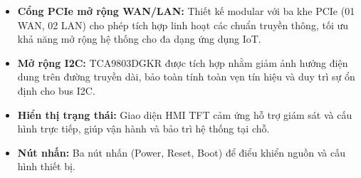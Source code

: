 \begin{itemize}
                        \item \textbf{Cổng PCIe mở rộng WAN/LAN:} 
                        Thiết kế modular với ba khe PCIe (01 WAN, 02 LAN) cho phép tích hợp linh hoạt các chuẩn truyền thông, tối ưu khả năng mở rộng hệ thống cho đa dạng ứng dụng IoT.
                        
                        \item \textbf{Mở rộng I2C:} 
                        TCA9803DGKR được tích hợp nhằm giảm ảnh hưởng điện dung trên đường truyền dài, bảo toàn tính toàn vẹn tín hiệu và duy trì sự ổn định cho bus I2C.
                        
                        \item \textbf{Hiển thị trạng thái:}  
                        Giao diện HMI TFT cảm ứng hỗ trợ giám sát và cấu hình trực tiếp, giúp vận hành và bảo trì hệ thống tại chỗ.
                        
                        \item \textbf{Nút nhấn:} 
                        Ba nút nhấn (Power, Reset, Boot) để điểu khiển nguồn và cấu hình thiết bị.
                        

\end{itemize}
